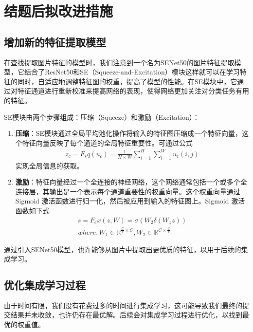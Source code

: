 \documentclass[UTF8]{ctexart}
\begin{document}
\section{结题后拟改进措施}
\subsection{增加新的特征提取模型}
在查找提取图片特征的模型时，我们注意到一个名为SENet50的图片特征提取模型，它结合了ResNet50和SE（Squeeze-and-Excitation）模块这样就可以在学习特征的同时，自适应地调整特征图的权重，提高了模型的性能。在SE模块中，它通过对特征通道进行重新校准来提高网络的表现，使得网络更加关注对分类任务有用的特征。

SE模块由两个步骤组成：压缩（Squeeze）和激励（Excitation）：
\begin{enumerate}
  \item \textbf{压缩}：SE模块通过全局平均池化操作将输入的特征图压缩成一个特征向量，这个特征向量反映了每个通道的全局特征重要性。可通过公式
  \begin{gather}
    z_c=F_sq(u_c)=\frac{1}{H\times W}\sum_{i = 1}^{H} \sum_{i = 1}^{W} u_c(i,j)
  \end{gather}
  实现全局信息的获取。
  \item \textbf{激励}：特征向量经过一个全连接的神经网络，这个网络通常包括一个或多个全连接层，其输出是一个表示每个通道重要性的权重向量。这个权重向量通过 Sigmoid 激活函数进行归一化，然后被应用到输入的特征图上。Sigmoid 激活函数如下式
  \begin{multline}
     s=F_ex(z,W)=\sigma (W_2\delta (W_1z))\\
     where,W_1\in \mathbb{R}^{\frac{C}{r}\times C},W_2\in \mathbb{R}^{C\times\frac{C}{r} } 
  \end{multline}
\end{enumerate}
通过引入SENet50模型，也许能够从图片中提取出更优质的特征，以用于后续的集成学习。

\subsection{优化集成学习过程}
由于时间有限，我们没有花费过多的时间进行集成学习，这可能导致我们最终的提交结果并未收敛，也许仍存在最优解。后续会对集成学习过程进行优化，以找到最优的权重值。
\end{document}
